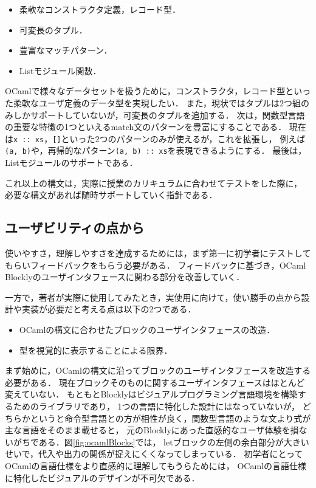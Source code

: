 \begin{itemize}
  \item 柔軟なコンストラクタ定義，レコード型．
  \item 可変長のタプル．
  \item 豊富なマッチパターン．
  \item Listモジュール関数．
\end{itemize}

OCamlで様々なデータセットを扱うために，コンストラクタ，レコード型といった柔軟なユーザ定義のデータ型を実現したい．
また，現状ではタプルは2つ組のみしかサポートしていないが，可変長のタプルを追加する．
次は，関数型言語の重要な特徴の1つといえるmatch文のパターンを豊富にすることである．
現在は{\tt x ::\ xs}，{\tt []}といった2つのパターンのみが使えるが，これを拡張し，
例えば{\tt (a, b)}や，再帰的なパターン{\tt (a, b) ::\ xs}を表現できるようにする．
最後は，Listモジュールのサポートである．

これ以上の構文は，実際に授業のカリキュラムに合わせてテストをした際に，
必要な構文があれば随時サポートしていく指針である．

\subsection*{ユーザビリティの点から}

使いやすさ，理解しやすさを達成するためには，まず第一に初学者にテストしてもらいフィードバックをもらう必要がある．
フィードバックに基づき，OCaml Blocklyのユーザインタフェースに関わる部分を改善していく．

一方で，著者が実際に使用してみたとき，実使用に向けて，使い勝手の点から設計や実装が必要だと考える点は以下の2つである．%
\begin{itemize}
 \item OCamlの構文に合わせたブロックのユーザインタフェースの改造．
 \item 型を視覚的に表示することによる限界．
\end{itemize}

まず始めに，OCamlの構文に沿ってブロックのユーザインタフェースを改造する必要がある．
現在ブロックそのものに関するユーザインタフェースはほとんど変えていない．
もともとBlocklyはビジュアルプログラミング言語環境を構築するためのライブラリであり，
1つの言語に特化した設計にはなっていないが，
どちらかというと命令型言語との方が相性が良く，関数型言語のような文より式が主な言語をそのまま載せると，
元のBlocklyにあった直感的なユーザ体験を損ないがちである．図\ref{fig:ocamlBlocks}では，
letブロックの左側の余白部分が大きいせいで，代入や出力の関係が捉えにくくなってしまっている．
初学者にとってOCamlの言語仕様をより直感的に理解してもうらためには，
OCamlの言語仕様に特化したビジュアルのデザインが不可欠である．

